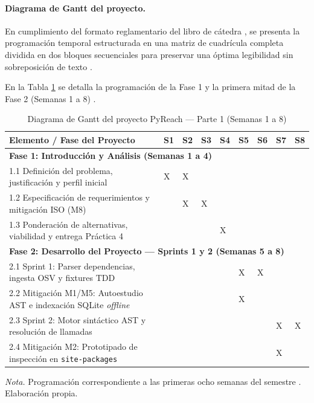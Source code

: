 \paragraph{Diagrama de Gantt del proyecto.}
En cumplimiento del formato reglamentario del libro de cátedra \parencite{torres2026proyecto}, se presenta la programación temporal estructurada en una matriz de cuadrícula completa dividida en dos bloques secuenciales para preservar una óptima legibilidad sin sobreposición de texto \parencite{torres2026proyecto}. %

En la Tabla \ref{tab:gantt_bloque1} se detalla la programación de la Fase 1 y la primera mitad de la Fase 2 (Semanas 1 a 8) \parencite{torres2026proyecto}. %

\begin{table}[H]
\centering
\caption{Diagrama de Gantt del proyecto PyReach — Parte 1 (Semanas 1 a 8)}
\label{tab:gantt_bloque1}
\footnotesize
\singlespacing
\setlength{\tabcolsep}{2.5pt}
\renewcommand{\arraystretch}{1.10}
\begin{tabularx}{\textwidth}{|X|*{8}{>{\centering\arraybackslash}p{0.62cm}|}}
\hline
\textbf{Elemento / Fase del Proyecto} & \textbf{S1} & \textbf{S2} & \textbf{S3} & \textbf{S4} & \textbf{S5} & \textbf{S6} & \textbf{S7} & \textbf{S8} \\
\hline
\multicolumn{9}{|l|}{\textbf{Fase 1: Introducción y Análisis (Semanas 1 a 4)}} \\
\hline
1.1 Definición del problema, justificación y perfil inicial & X & X & & & & & & \\
\hline
1.2 Especificación de requerimientos y mitigación ISO (M8) & & X & X & & & & & \\
\hline
1.3 Ponderación de alternativas, viabilidad y entrega Práctica 4 & & & & X & & & & \\
\hline
\multicolumn{9}{|l|}{\textbf{Fase 2: Desarrollo del Proyecto — Sprints 1 y 2 (Semanas 5 a 8)}} \\
\hline
2.1 Sprint 1: Parser dependencias, ingesta OSV y fixtures TDD & & & & & X & X & & \\
\hline
2.2 Mitigación M1/M5: Autoestudio AST e indexación SQLite \textit{offline} & & & & & X & & & \\
\hline
2.3 Sprint 2: Motor sintáctico AST y resolución de llamadas & & & & & & & X & X \\
\hline
2.4 Mitigación M2: Prototipado de inspección en \texttt{site-packages} & & & & & & & X & \\
\hline
\end{tabularx}
\vspace{2pt}
\begin{flushleft}
\scriptsize \textit{Nota.} Programación correspondiente a las primeras ocho semanas del semestre \parencite{torres2026proyecto}. Elaboración propia. %
\end{flushleft}
\end{table}

